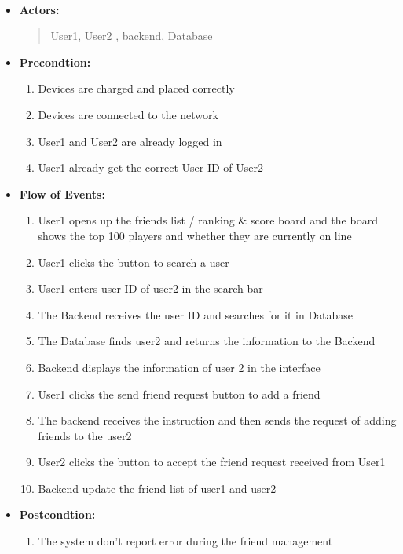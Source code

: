 \documentclass[a4paper]{article}
\begin{document}
	\hspace*{\fill}\\

	\begin{itemize}
		\item[] \textbf{Actors:}
		\begin{quote}
			User1, User2 , backend, Database
		\end{quote}
		\item[] \textbf{Precondtion:}
		\begin{enumerate}[itemindent=1em]
			\item Devices are charged and placed correctly
			\item Devices are connected to the network
			\item User1 and User2 are already logged in
			\item User1 already get the correct User ID of User2
		\end{enumerate}
		\item[] \textbf{Flow of Events:}
		\begin{enumerate}[itemindent=1em]
			\item User1 opens up the friends list / ranking \& score board and the board shows the top 100 players and whether they are currently on line
			\item User1 clicks the button to search a user
			\item User1 enters user ID of user2 in the search bar
			\item The Backend receives the user ID and searches for it in Database
			\item The Database finds user2 and returns the information to the Backend
			\item Backend displays the information of user 2 in the interface
			\item User1 clicks the send friend request button to add a friend
			\item The backend receives the instruction and then sends the request of adding friends to the user2
			\item User2 clicks the button to accept the friend request received from User1
			\item Backend update the friend list of user1 and user2		
		\end{enumerate}
		\item[] \textbf{Postcondtion:}
		\begin{enumerate}[itemindent=1em]
			\item The system don't report error during the friend management

\end{enumerate}
\end{itemize}
\end{document}
